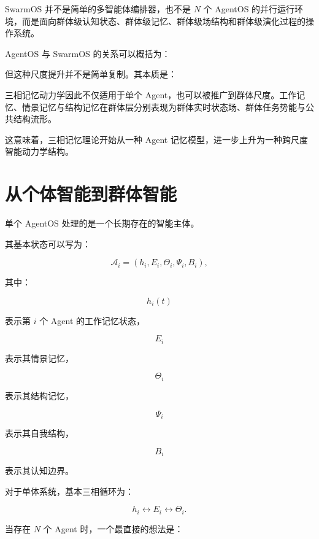 SwarmOS 并不是简单的多智能体编排器，也不是 $N$ 个 AgentOS 的并行运行环境，而是面向群体级认知状态、群体级记忆、群体级场结构和群体级演化过程的操作系统。

AgentOS 与 SwarmOS 的关系可以概括为：

\begin{statementbox}
\centering
{}
\end{statementbox}

但这种尺度提升并不是简单复制。其本质是：

\begin{statementbox}
\centering
{}
\end{statementbox}

三相记忆动力学因此不仅适用于单个 Agent，也可以被推广到群体尺度。工作记忆、情景记忆与结构记忆在群体层分别表现为群体实时状态场、群体任务势能与公共结构流形。

这意味着，三相记忆理论开始从一种 Agent 记忆模型，进一步上升为一种跨尺度智能动力学结构。


\section{从个体智能到群体智能}

单个 AgentOS 处理的是一个长期存在的智能主体。

其基本状态可以写为：

\[
\mathcal{A}_i
=
\left(
h_i,
E_i,
\Theta_i,
\Psi_i,
B_i
\right),
\]

其中：

\[
h_i(t)
\]

表示第 $i$ 个 Agent 的工作记忆状态，

\[
E_i
\]

表示其情景记忆，

\[
\Theta_i
\]

表示其结构记忆，

\[
\Psi_i
\]

表示其自我结构，

\[
B_i
\]

表示其认知边界。

对于单体系统，基本三相循环为：

\[
h_i
\leftrightarrow
E_i
\leftrightarrow
\Theta_i.
\]

当存在 $N$ 个 Agent 时，一个最直接的想法是：

